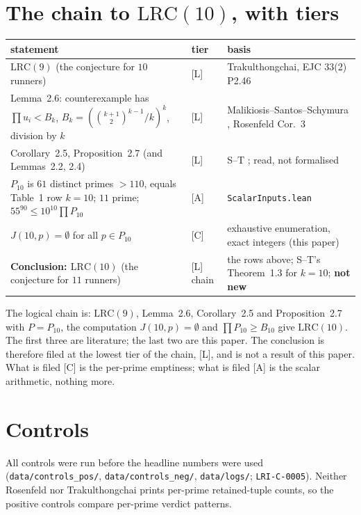 \documentclass[10pt]{article}
\newcommand{\tier}[1]{\textsf{[#1]}}
\newcommand{\tA}{\tier{A}}
\newcommand{\tL}{\tier{L}}
\newcommand{\tC}{\tier{C}}
\newcommand{\lean}[1]{\texttt{#1}}
\newcommand{\LRC}[1]{\mathrm{LRC}(#1)}
\begin{document}
\section{The chain to $\LRC{10}$, with tiers}\label{sec:tiers}
\begin{center}\small\begin{tabular}{p{7.0cm}p{0.8cm}p{5.4cm}}\toprule
statement & tier & basis\\\midrule
$\LRC{9}$ (the conjecture for $10$ runners) & \tL & Trakulthongchai, EJC 33(2) P2.46 \cite{trak}\\
Lemma~2.6: counterexample has $\prod u_i<B_k$, $B_k=(\binom{k+1}2^{k-1}/k)^k$, division by $k$ & \tL & Malikiosis--Santos--Schymura \cite{mss}, Rosenfeld Cor.~3 \cite{ros}\\
Corollary~2.5, Proposition~2.7 (and Lemmas~2.2, 2.4) & \tL & S--T \cite{st}; read, not formalised\\
$P_{10}$ is $61$ distinct primes $>110$, equals Table~1 row $k=10$; $11$ prime; $55^{90}\le10^{10}\prod P_{10}$ & \tA & \lean{ScalarInputs.lean}\\
$J(10,p)=\emptyset$ for all $p\in P_{10}$ & \tC & exhaustive enumeration, exact integers (this paper)\\
\textbf{Conclusion: $\LRC{10}$} (the conjecture for $11$ runners) & \tL{} chain & the rows above; S--T's Theorem~1.3 for $k=10$; \textbf{not new}\\\bottomrule
\end{tabular}\end{center}
The logical chain is: $\LRC{9}$, Lemma~2.6, Corollary~2.5 and Proposition~2.7 with $P=P_{10}$, the computation $J(10,p)=\emptyset$ and $\prod P_{10}\ge B_{10}$ give $\LRC{10}$. The first three are literature; the last two are this paper. The conclusion is therefore filed at the lowest tier of the chain, \tL{}, and is not a result of this paper. What is filed \tC{} is the per-prime emptiness; what is filed \tA{} is the scalar arithmetic, nothing more.

\section{Controls}\label{sec:controls}
All controls were run before the headline numbers were used (\texttt{data/controls\_pos/}, \texttt{data/controls\_neg/}, \texttt{data/logs/}; \texttt{LRI-C-0005}). Neither Rosenfeld nor Trakulthongchai prints per-prime retained-tuple counts, so the positive controls compare per-prime verdict patterns.
\end{document}
